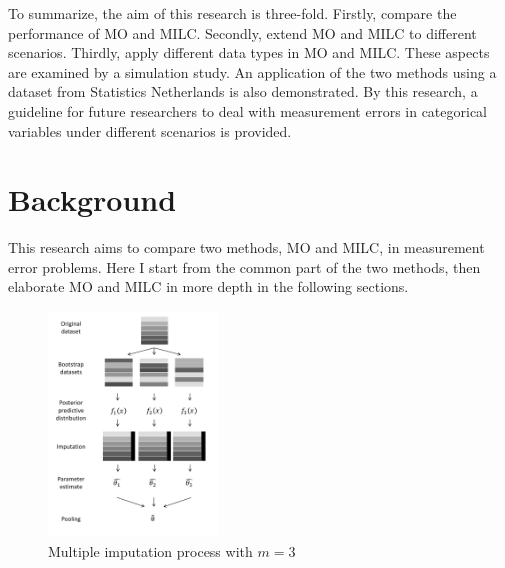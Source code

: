 \documentclass[oneside,a4paper]{article}
\begin{document}
To summarize, the aim of this research is three-fold. Firstly, compare the performance of MO and MILC. Secondly, extend MO and MILC to different scenarios. Thirdly, apply different data types in MO and MILC. These aspects are examined by a simulation study. An application of the two methods using a dataset from Statistics Netherlands is also demonstrated. By this research, a guideline for future researchers to deal with measurement errors in categorical variables under different scenarios is provided. 

\section{Background}
This research aims to compare two methods, MO and MILC, in measurement error problems. Here I start from the common part of the two methods, then elaborate MO and MILC in more depth in the following sections.

\begin{figure}
    \centering
    \includegraphics[width=0.4\textwidth]{MI.pdf}
    \caption{Multiple imputation process with $m=3$}
    \label{fig:MI}
\end{figure}
\end{document}
